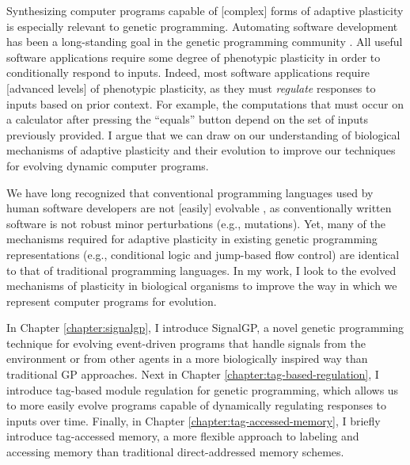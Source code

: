 Synthesizing computer programs capable of [complex] forms of adaptive plasticity is especially relevant to genetic programming.
Automating software development has been a long-standing goal in the genetic programming community \citep{koza_hierarchical_1989,oneill_automatic_2019}.
All useful software applications require some degree of phenotypic plasticity in order to conditionally respond to inputs.
Indeed, most software applications require [advanced levels] of phenotypic plasticity, as they must \textit{regulate} responses to inputs based on prior context.
For example, the computations that must occur on a calculator after pressing the ``equals'' button depend on the set of inputs previously provided.
I argue that we can draw on our understanding of biological mechanisms of adaptive plasticity and their evolution to improve our techniques for evolving dynamic computer programs. 

We have long recognized that conventional programming languages used by human software developers are not [easily] evolvable \citep{rasmussen_coreworld_1990}, as conventionally written software is not robust minor perturbations (e.g., mutations). 
Yet, many of the mechanisms required for adaptive plasticity in existing genetic programming representations (e.g., conditional logic and jump-based flow control) are identical to that of traditional programming languages. 
In my work, I look to the evolved mechanisms of plasticity in biological organisms to improve the way in which we represent computer programs for evolution.

In Chapter \ref{chapter:signalgp}, I introduce SignalGP, a novel genetic programming technique for evolving event-driven programs that handle signals from the environment or from other agents in a more biologically inspired way than traditional GP approaches.
Next in Chapter \ref{chapter:tag-based-regulation}, I introduce tag-based module regulation for genetic programming, which allows us to more easily evolve programs capable of dynamically regulating responses to inputs over time.
Finally, in Chapter \ref{chapter:tag-accessed-memory}, I briefly introduce tag-accessed memory, a more flexible approach to labeling and accessing memory than traditional direct-addressed memory schemes.

